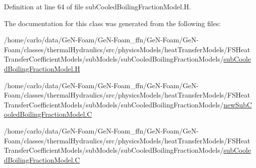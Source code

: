 Definition at line 64 of file sub\+Cooled\+Boiling\+Fraction\+Model.\+H.



The documentation for this class was generated from the following files\+:\begin{DoxyCompactItemize}
\item 
/home/carlo/data/\+Ge\+N-\/\+Foam/\+Ge\+N-\/\+Foam\+\_\+ffn/\+Ge\+N-\/\+Foam/\+Ge\+N-\/\+Foam/classes/thermal\+Hydraulics/src/physics\+Models/heat\+Transfer\+Models/\+F\+S\+Heat\+Transfer\+Coefficient\+Models/sub\+Models/sub\+Cooled\+Boiling\+Fraction\+Models/\hyperlink{subCooledBoilingFractionModel_8H}{sub\+Cooled\+Boiling\+Fraction\+Model.\+H}\item 
/home/carlo/data/\+Ge\+N-\/\+Foam/\+Ge\+N-\/\+Foam\+\_\+ffn/\+Ge\+N-\/\+Foam/\+Ge\+N-\/\+Foam/classes/thermal\+Hydraulics/src/physics\+Models/heat\+Transfer\+Models/\+F\+S\+Heat\+Transfer\+Coefficient\+Models/sub\+Models/sub\+Cooled\+Boiling\+Fraction\+Models/\hyperlink{newSubCooledBoilingFractionModel_8C}{new\+Sub\+Cooled\+Boiling\+Fraction\+Model.\+C}\item 
/home/carlo/data/\+Ge\+N-\/\+Foam/\+Ge\+N-\/\+Foam\+\_\+ffn/\+Ge\+N-\/\+Foam/\+Ge\+N-\/\+Foam/classes/thermal\+Hydraulics/src/physics\+Models/heat\+Transfer\+Models/\+F\+S\+Heat\+Transfer\+Coefficient\+Models/sub\+Models/sub\+Cooled\+Boiling\+Fraction\+Models/\hyperlink{subCooledBoilingFractionModel_8C}{sub\+Cooled\+Boiling\+Fraction\+Model.\+C}\end{DoxyCompactItemize}

